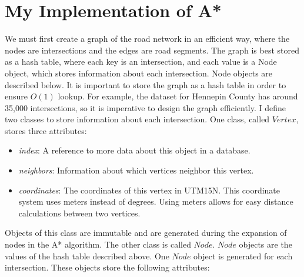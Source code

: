 \documentclass[conference]{IEEEtran}
\begin{document}
\section{My Implementation of A*}
We must first create a graph of the road network in an efficient way, where the nodes are intersections and the edges are road segments. The graph is best stored as a hash table, where each key is an intersection, and each value is a Node object, which stores information about each intersection. Node objects are described below.
\newline
\newline
It is important to store the graph as a hash table in order to ensure $O(1)$ lookup. For example, the dataset for Hennepin County has around 35,000 intersections, so it is imperative to design the graph efficiently.
\newline
\newline
I define two classes to store information about each intersection. One class, called $Vertex$, stores three attributes:
\begin{itemize}
    \item \textit{index}: A reference to more data about this object in a database.

    \item \textit{neighbors}: Information about which vertices neighbor this vertex.

    \item \textit{coordinates}: The coordinates of this vertex in UTM15N. This coordinate system uses meters instead of degrees. Using meters allows for easy distance calculations between two vertices.

\end{itemize}
Objects of this class are immutable and are generated during the expansion of nodes in the A* algorithm.
\newline
\newline
The other class is called $Node$. $Node$ objects are the values of the hash table described above. One $Node$ object is generated for each intersection. These objects store the following attributes:
\end{document}
